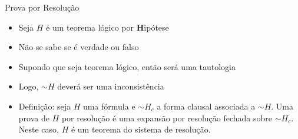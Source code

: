 \begin{frame}{Prova por Resolução}

\begin{itemize}
\item Seja $H$ é um teorema lógico por {\bf H}ipótese

\item Não se sabe se é verdade ou falso

\item Supondo que seja teorema lógico, então será  uma tautologia

\item Logo, $\sim H$ deverá ser uma inconsistência


\item Definição: seja $H$ uma fórmula e $\sim H_c$ a forma clausal associada a $\sim H$. Uma prova de $H$ por resolução é uma expansão por resolução fechada sobre $\sim H_c$. Neste caso, $H$ é um teorema do sistema de resolução.

\end{itemize}


\end{frame}

